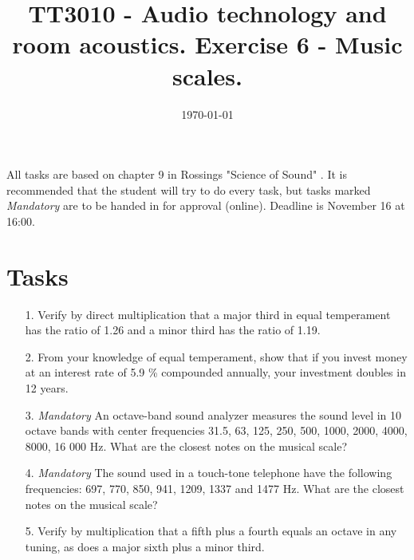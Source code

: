 \documentclass{article}
\title{TT3010 - Audio technology and room acoustics. \newline Exercise 6 - Music scales.}
\date{\today}
\begin{document}
\maketitle

All tasks are based on chapter 9 in Rossings "Science of Sound" \cite{rossing}. 
It is recommended that the student will try to do every task, but tasks marked \textit{Mandatory} are to be handed in for approval (online). Deadline is November 16 at 16:00.

\section*{Tasks}
\begin{itemize}
    \item [1.] Verify by direct multiplication that a major third in equal temperament has the ratio of 1.26 and a minor third has the ratio of 1.19.
  
    \item[2.] From your knowledge of equal temperament, show that if you invest money at an interest rate of 5.9 \% compounded annually, your investment doubles  in 12 years.
    
    \item[3.] \textit{Mandatory} An octave-band sound analyzer measures the sound level in 10 octave bands with center frequencies 31.5, 63, 125, 250, 500, 1000, 2000, 4000, 8000, 16 000 Hz. What are the closest notes on the musical scale?

    \item[4.] \textit{Mandatory} The sound used in a touch-tone telephone have the following frequencies: 697, 770, 850, 941, 1209, 1337 and 1477 Hz. What are the closest notes on the musical scale?
    
    \item[5.] Verify by multiplication that a fifth plus a fourth equals an octave in any tuning, as does a major sixth plus a minor third.
    
    

\end{itemize}
\end{document}
